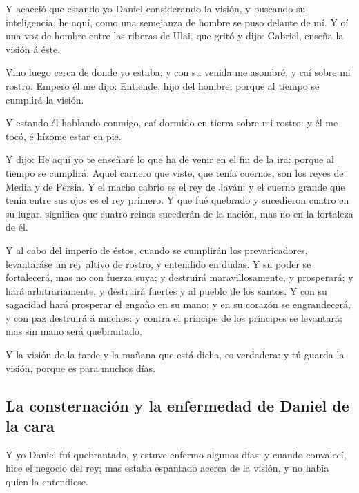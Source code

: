  Y acaeció que estando yo Daniel considerando la visión, y
buscando su inteligencia, he aquí, como una semejanza de hombre se puso
delante de mí.  Y oí una voz de hombre entre las riberas de
Ulai, que gritó y dijo: Gabriel, enseña la visión á éste.

 Vino luego cerca de donde yo estaba; y con su venida me
asombré, y caí sobre mi rostro. Empero él me dijo: Entiende, hijo del
hombre, porque al tiempo se cumplirá la visión.

 Y estando él hablando conmigo, caí dormido en tierra sobre
mi rostro: y él me tocó, é hízome estar en pie.

 Y dijo: He aquí yo te enseñaré lo que ha de venir en el
fin de la ira: porque al tiempo se cumplirá:  Aquel carnero
que viste, que tenía cuernos, son los reyes de Media y de Persia.
 Y el macho cabrío es el rey de Javán: y el cuerno grande
que tenía entre sus ojos es el rey primero.  Y que fué
quebrado y sucedieron cuatro en su lugar, significa que cuatro reinos
sucederán de la nación, mas no en la fortaleza de él.

 Y al cabo del imperio de éstos, cuando se cumplirán los
prevaricadores, levantaráse un rey altivo de rostro, y entendido en
dudas.  Y su poder se fortalecerá, mas no con fuerza suya;
y destruirá maravillosamente, y prosperará; y hará arbitrariamente, y
destruirá fuertes y al pueblo de los santos.  Y con su
sagacidad hará prosperar el engaño en su mano; y en su corazón se
engrandecerá, y con paz destruirá á muchos: y contra el príncipe de los
príncipes se levantará; mas sin mano será quebrantado.

 Y la visión de la tarde y la mañana que está dicha, es
verdadera: y tú guarda la visión, porque es para muchos días.

\hypertarget{la-consternaciuxf3n-y-la-enfermedad-de-daniel-de-la-cara}{%
\subsection{La consternación y la enfermedad de Daniel de la
cara}\label{la-consternaciuxf3n-y-la-enfermedad-de-daniel-de-la-cara}}

 Y yo Daniel fuí quebrantado, y estuve enfermo algunos
días: y cuando convalecí, hice el negocio del rey; mas estaba espantado
acerca de la visión, y no había quien la entendiese.

